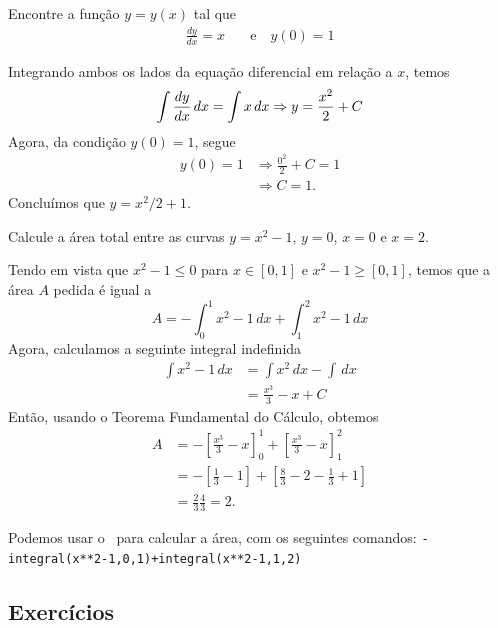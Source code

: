 \cleardoublepage\documentclass[../main.tex]{subfiles}
\begin{document}
\begin{exeresol}
  Encontre a função $y = y(x)$ tal que
  \begin{align*}
    \frac{dy}{dx} = x &\quad   \textrm{e}\quad y(0) = 1
  \end{align*}
  \end{exeresol}
\begin{resol}
  Integrando ambos os lados da equação diferencial em relação a $x$, temos
  \begin{equation*}
    \int \frac{dy}{dx}\,dx = \int x\,dx \Rightarrow y = \frac{x^2}{2} + C \\
  \end{equation*}
  Agora, da condição $y(0) = 1$, segue
  \begin{align*}
    y(0) = 1 &\Rightarrow \frac{0^2}{2} + C = 1 \\
             &\Rightarrow C = 1.
  \end{align*}
  Concluímos que $y = x^2/2 + 1$.
\end{resol}
\begin{exeresol}
  Calcule a área total entre as curvas $y=x^2-1$, $y=0$, $x=0$ e $x=2$.
  
  \begin{resol}
  Tendo em vista que $x^2-1\leq 0$ para $x\in [0, 1]$ e $x^2-1\geq [0, 1]$, temos que a área $A$ pedida é igual a
  \begin{equation*}
    A = -\int_0^1 x^2 -1\,dx + \int_1^2 x^2-1\,dx
  \end{equation*}
  Agora, calculamos a seguinte integral indefinida
  \begin{align*}
    \int x^2 - 1\,dx &= \int x^2\,dx - \int\,dx \\
                     &= \frac{x^3}{3} - x + C
  \end{align*}
  Então, usando o Teorema Fundamental do Cálculo, obtemos
  \begin{align*}
    A &= -\left[\frac{x^3}{3}-x\right]_0^1 + \left[\frac{x^3}{3}-x\right]_1^2\\
      &= - \left[\frac{1}{3}-1\right] + \left[\frac{8}{3} - 2 - \frac{1}{3} + 1\right] \\
      &= \frac{2}{3} \frac{4}{3} = 2.
  \end{align*}

Podemos usar o \geogebra~para calcular a área, com os seguintes comandos: \verb|-integral(x**2-1,0,1)+integral(x**2-1,1,2)|
\end{resol}
\end{exeresol}
\subsection{Exercícios}
\end{document}
